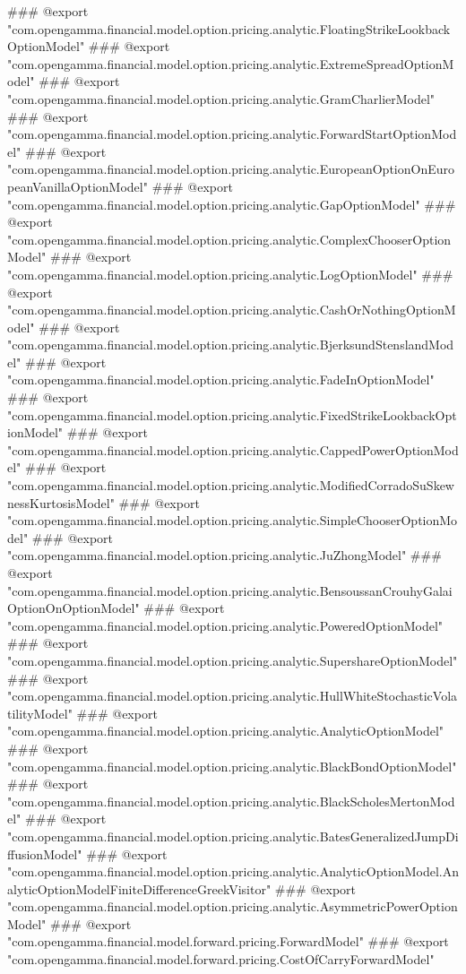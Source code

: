### @export "com.opengamma.financial.model.option.pricing.analytic.FloatingStrikeLookbackOptionModel"
### @export "com.opengamma.financial.model.option.pricing.analytic.ExtremeSpreadOptionModel"
### @export "com.opengamma.financial.model.option.pricing.analytic.GramCharlierModel"
### @export "com.opengamma.financial.model.option.pricing.analytic.ForwardStartOptionModel"
### @export "com.opengamma.financial.model.option.pricing.analytic.EuropeanOptionOnEuropeanVanillaOptionModel"
### @export "com.opengamma.financial.model.option.pricing.analytic.GapOptionModel"
### @export "com.opengamma.financial.model.option.pricing.analytic.ComplexChooserOptionModel"
### @export "com.opengamma.financial.model.option.pricing.analytic.LogOptionModel"
### @export "com.opengamma.financial.model.option.pricing.analytic.CashOrNothingOptionModel"
### @export "com.opengamma.financial.model.option.pricing.analytic.BjerksundStenslandModel"
### @export "com.opengamma.financial.model.option.pricing.analytic.FadeInOptionModel"
### @export "com.opengamma.financial.model.option.pricing.analytic.FixedStrikeLookbackOptionModel"
### @export "com.opengamma.financial.model.option.pricing.analytic.CappedPowerOptionModel"
### @export "com.opengamma.financial.model.option.pricing.analytic.ModifiedCorradoSuSkewnessKurtosisModel"
### @export "com.opengamma.financial.model.option.pricing.analytic.SimpleChooserOptionModel"
### @export "com.opengamma.financial.model.option.pricing.analytic.JuZhongModel"
### @export "com.opengamma.financial.model.option.pricing.analytic.BensoussanCrouhyGalaiOptionOnOptionModel"
### @export "com.opengamma.financial.model.option.pricing.analytic.PoweredOptionModel"
### @export "com.opengamma.financial.model.option.pricing.analytic.SupershareOptionModel"
### @export "com.opengamma.financial.model.option.pricing.analytic.HullWhiteStochasticVolatilityModel"
### @export "com.opengamma.financial.model.option.pricing.analytic.AnalyticOptionModel"
### @export "com.opengamma.financial.model.option.pricing.analytic.BlackBondOptionModel"
### @export "com.opengamma.financial.model.option.pricing.analytic.BlackScholesMertonModel"
### @export "com.opengamma.financial.model.option.pricing.analytic.BatesGeneralizedJumpDiffusionModel"
### @export "com.opengamma.financial.model.option.pricing.analytic.AnalyticOptionModel.AnalyticOptionModelFiniteDifferenceGreekVisitor"
### @export "com.opengamma.financial.model.option.pricing.analytic.AsymmetricPowerOptionModel"
### @export "com.opengamma.financial.model.forward.pricing.ForwardModel"
### @export "com.opengamma.financial.model.forward.pricing.CostOfCarryForwardModel"
